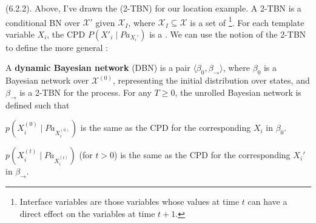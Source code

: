 \documentclass[11pt]{article}
\begin{document}
\myspace
\p {} (6.2.2). Above, I've drawn the  (2-TBN) for our location example. A 2-TBN is a conditional BN over $\mathcal{X}'$ given $\mathcal{X}_I$, where $\mathcal{X}_I \subseteq \mathcal{X}$ is a set of \footnote{Interface variables are those variables whose values at time $t$ can have a direct effect on the variables at time $t+1$.}. For each template variable $X_i$, the CPD $P(X'_i \mid Pa_{X_i'})$ is a . We can use the notion of the 2-TBN to define the more general :
\begin{definition}
	A \textbf{dynamic Bayesian network} (DBN) is a pair $\langle \beta_0, \beta_{\rightarrow} \rangle$, where $\beta_0$ is a Bayesian network over $\mathcal{X}^{(0)}$, representing the initial distribution over states, and $\beta_{\rightarrow}$ is a 2-TBN for the process. For any $T \ge 0$, the unrolled Bayesian network is defined such that
	\begin{compactitem}
		\item $p(X_i^{(0)} \mid Pa_{X_i^{(0)}})$ is the same as the CPD for the corresponding $X_i$ in $\beta_0$.
		\item $p(X_i^{(t)} \mid Pa_{X_i^{(t)}})$ (for $t > 0$) is the same as the CPD for the corresponding $X_i'$ in $\beta_{\rightarrow}$.  
	\end{compactitem}
\end{definition}
\end{document}
